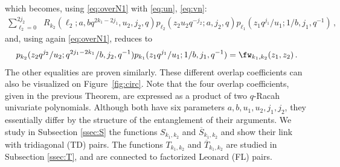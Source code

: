 \documentclass[11pt]{amsart}
\numberwithin{equation}{section}
\numberwithin{equation}{section}
\begin{document}
which becomes, using \eqref{eq:overN1}  with \eqref{eq:un}, \eqref{eq:vn}:
\begin{align}
     \sum_{\ell_2=0}^{2j_2} 
 & R_{k_2}(\ell_2;a,bq^{2k_1-2j_1},u_2,j_2,q)
  p_{\ell_2}(z_2u_2q^{-j_2};a,j_2,q) p_{\ell_1}(z_1q^{j_1}/u_1;1/b,j_1,q^{-1})\,,
\end{align}
and, using again  \eqref{eq:overN1}, reduces to
\begin{align}
  p_{k_2}(z_2q^{j_2}/u_2;q^{2j_1-2k_1}/b,j_2,q^{-1}) p_{k_1}(z_1q^{j_1}/u_1;1/b,j_1,q^{-1})=\fw_{k_1,k_2}(z_1,z_2)\,.
\end{align}
The other equalities are proven similarly.
\endproof
These different overlap coefficients can also be visualized on Figure~\ref{fig:circ}.
 Note that the four overlap coefficients, given in the previous Theorem, are expressed as a product of two $q$-Racah univariate polynomials. Although both have six parameters $a,b,u_1,u_2,j_1,j_2$, they essentially differ by the structure of the entanglement of their arguments. We study in Subsection \ref{ssec:S} the functions $S_{k_1,k_2}$ and $\overline{S}_{k_1,k_2}$ and show their link with tridiagonal (TD) pairs. The functions $T_{k_1,k_2}$ and $\overline{T}_{k_1,k_2}$ are  studied in Subsection \ref{ssec:T}, and are connected to factorized Leonard (FL) pairs.
\end{document}
